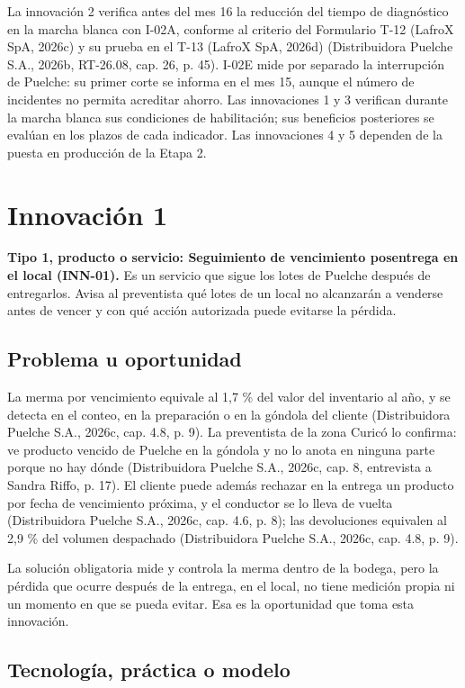 La innovación 2 verifica antes del mes 16 la reducción del tiempo de diagnóstico en la marcha blanca con I-02A, conforme al criterio del Formulario T-12 (LafroX SpA, 2026c) y su prueba en el T-13 (LafroX SpA, 2026d) (Distribuidora Puelche S.A., 2026b, RT-26.08, cap. 26, p. 45). I-02E mide por separado la interrupción de Puelche: su primer corte se informa en el mes 15, aunque el número de incidentes no permita acreditar ahorro. Las innovaciones 1 y 3 verifican durante la marcha blanca sus condiciones de habilitación; sus beneficios posteriores se evalúan en los plazos de cada indicador. Las innovaciones 4 y 5 dependen de la puesta en producción de la Etapa 2.

\section{Innovación 1}

\textbf{Tipo 1, producto o servicio: Seguimiento de vencimiento posentrega en el local (INN-01).} Es un servicio que sigue los lotes de Puelche después de entregarlos. Avisa al preventista qué lotes de un local no alcanzarán a venderse antes de vencer y con qué acción autorizada puede evitarse la pérdida.

\subsection{Problema u oportunidad}

La merma por vencimiento equivale al 1,7 \% del valor del inventario al año, y se detecta en el conteo, en la preparación o en la góndola del cliente (Distribuidora Puelche S.A., 2026c, cap. 4.8, p. 9). La preventista de la zona Curicó lo confirma: ve producto vencido de Puelche en la góndola y no lo anota en ninguna parte porque no hay dónde (Distribuidora Puelche S.A., 2026c, cap. 8, entrevista a Sandra Riffo, p. 17). El cliente puede además rechazar en la entrega un producto por fecha de vencimiento próxima, y el conductor se lo lleva de vuelta (Distribuidora Puelche S.A., 2026c, cap. 4.6, p. 8); las devoluciones equivalen al 2,9 \% del volumen despachado (Distribuidora Puelche S.A., 2026c, cap. 4.8, p. 9).

La solución obligatoria mide y controla la merma dentro de la bodega, pero la pérdida que ocurre después de la entrega, en el local, no tiene medición propia ni un momento en que se pueda evitar. Esa es la oportunidad que toma esta innovación.

\subsection{Tecnología, práctica o modelo}

